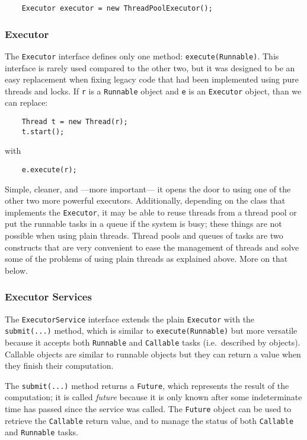 \begin{verbatim}
    Executor executor = new ThreadPoolExecutor();
\end{verbatim}

\subsubsection{Executor}
\label{sec:executor}

The \verb+Executor+ interface defines only one method:
\verb+execute(Runnable)+. This interface is rarely used compared to
the other two, but it was designed to be an easy replacement when
fixing legacy code that had been implemented using pure threads and
locks. If \verb+r+ is a \verb+Runnable+ object and \verb+e+ is an
\verb+Executor+ object, than we can replace:

\begin{verbatim}
    Thread t = new Thread(r);
    t.start();
\end{verbatim}

with 

\begin{verbatim}
    e.execute(r);
\end{verbatim}

Simple, cleaner, and ---more important--- it opens the door to using
one of the other two more powerful executors. Additionally, depending
on the class that implements the \verb+Executor+, it may be able to
reuse threads from a thread pool or put the runnable tasks in a queue
if the system is busy; these things are not possible when using plain
threads. Thread pools and queues of tasks are two constructs that
are very convenient to ease the management of threads and solve some
of the problems of using plain threads as explained above. More on
that below. 

\subsubsection{Executor Services}
\label{sec:executor-services}

The \verb+ExecutorService+ interface extends the plain \verb+Executor+
with the \verb+submit(...)+ method, which is similar to
\verb+execute(Runnable)+ but more versatile because it accepts both
\verb+Runnable+ and \verb+Callable+ tasks (i.e.~described by
objects). Callable objects are similar to runnable objects but they
can return a value when they finish their computation. 

The \verb+submit(...)+ method returns a \verb+Future+, which represents
the result of the computation; it is called \emph{future} because it
is only known after some indeterminate time has passed since the service
was called. The \verb+Future+ object can be used to retrieve the
\verb+Callable+ return value, 
and to manage the status of both \verb+Callable+ and
\verb+Runnable+ tasks. 

